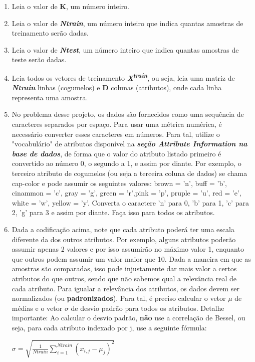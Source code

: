 \documentclass{article}
\begin{document}
\begin{enumerate}
\item  Leia o valor de \textbf{K}, um número inteiro.
\item Leia o valor de \textbf{\emph{Ntrain}}, um número inteiro que indica quantas amostras de treinamento serão dadas.
\item Leia o valor de \textbf{\emph{Ntest}}, um número inteiro que indica quantas amostras de teste serão dadas.
\item Leia todos os vetores de treinamento \textbf{\emph{X\textsuperscript{train}}}, ou seja, leia uma matriz de \textbf{\emph{Ntrain}} linhas (cogumelos) e \textbf{D} colunas (atributos), onde cada linha representa uma amostra.
\item No problema desse projeto, os dados são fornecidos como uma sequência de caracteres separados por espaço. Para usar uma métrica numérica, é necessário converter esses caracteres em números. Para tal, utilize o "vocabulário" de atributos disponível na \textbf{\emph{seção Attribute Information na base de dados}}, de forma que o valor do atributo listado primeiro é convertido ao número 0, o segundo a 1, e assim por diante. Por exemplo, o terceiro atributo de cogumelos (ou seja a terceira coluna de dados) se chama cap-color e pode assumir os seguintes valores:  brown = 'n', buff = 'b', cinammon = 'c', gray = 'g', green = 'r',pink = 'p', pruple = 'u', red = 'e', white = 'w', yellow = 'y'.  Converta o caractere 'n' para 0, 'b' para 1, 'c' para 2, 'g' para 3 e assim por diante. Faça isso para todos os atributos.
\item Dada a codificação acima, note que cada atributo poderá ter uma escala diferente da dos outros atributos. Por exemplo, alguns atributos poderão assumir apenas 2 valores e por isso assumirão no máximo valor 1, enquanto que outros podem assumir um valor maior que 10. Dada a maneira em que as amostras são comparadas, isso pode injustamente dar mais valor a certos atributos do que outros, sendo que não sabemos qual a relevância real de cada atributo. Para igualar a relevância dos atributos, os dados devem ser normalizados (ou \textbf{padronizados}). Para tal, é preciso calcular o vetor \textbf{$\mu$} de médias e o vetor \textbf{$\sigma$} de desvio padrão para todos os atributos. Detalhe importante: Ao calcular o desvio padrão, \textbf{não} use a correlação de Bessel, ou seja, para cada atributo indexado por j, use a seguinte fórmula: 

$ \sigma = \sqrt{\frac{1}{Ntrain}\sum\limits_{i=1}^{Ntrain} (x_{i,j} - \mu_j )^{2}} $



\end{enumerate}
\end{document}
